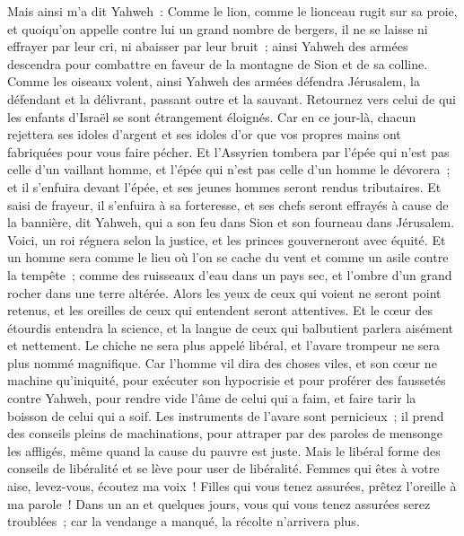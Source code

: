 \begin{multicols}{2}
Mais ainsi m'a dit Yahweh~: Comme le lion, comme le lionceau rugit sur sa proie, et quoiqu'on appelle contre lui un grand nombre de bergers, il ne se laisse ni effrayer par leur cri, ni abaisser par leur bruit~; ainsi Yahweh des armées descendra pour combattre en faveur de la montagne de Sion et de sa colline.
Comme les oiseaux volent, ainsi Yahweh des armées défendra Jérusalem, la défendant et la délivrant, passant outre et la sauvant.
Retournez vers celui de qui les enfants d'Israël se sont étrangement éloignés.
Car en ce jour-là, chacun rejettera ses idoles d'argent et ses idoles d'or que vos propres mains ont fabriquées pour vous faire pécher.
Et l'Assyrien tombera par l'épée qui n'est pas celle d'un vaillant homme, et l'épée qui n'est pas celle d'un homme le dévorera~; et il s'enfuira devant l'épée, et ses jeunes hommes seront rendus tributaires.
Et saisi de frayeur, il s'enfuira à sa forteresse, et ses chefs seront effrayés à cause de la bannière, dit Yahweh, qui a son feu dans Sion et son fourneau dans Jérusalem.
\VerseOne{}Voici, un roi régnera selon la justice, et les princes gouverneront avec équité.
Et un homme sera comme le lieu où l'on se cache du vent et comme un asile contre la tempête~; comme des ruisseaux d'eau dans un pays sec, et l'ombre d'un grand rocher dans une terre altérée.
Alors les yeux de ceux qui voient ne seront point retenus, et les oreilles de ceux qui entendent seront attentives.
Et le cœur des étourdis entendra la science, et la langue de ceux qui balbutient parlera aisément et nettement.
Le chiche ne sera plus appelé libéral, et l'avare trompeur ne sera plus nommé magnifique.
Car l'homme vil dira des choses viles, et son cœur ne machine qu'iniquité, pour exécuter son hypocrisie et pour proférer des faussetés contre Yahweh, pour rendre vide l'âme de celui qui a faim, et faire tarir la boisson de celui qui a soif.
Les instruments de l'avare sont pernicieux~; il prend des conseils pleins de machinations, pour attraper par des paroles de mensonge les affligés, même quand la cause du pauvre est juste.
Mais le libéral forme des conseils de libéralité et se lève pour user de libéralité.
Femmes qui êtes à votre aise, levez-vous, écoutez ma voix~! Filles qui vous tenez assurées, prêtez l'oreille à ma parole~!
Dans un an et quelques jours, vous qui vous tenez assurées serez troublées~; car la vendange a manqué, la récolte n'arrivera plus.

\end{multicols}
